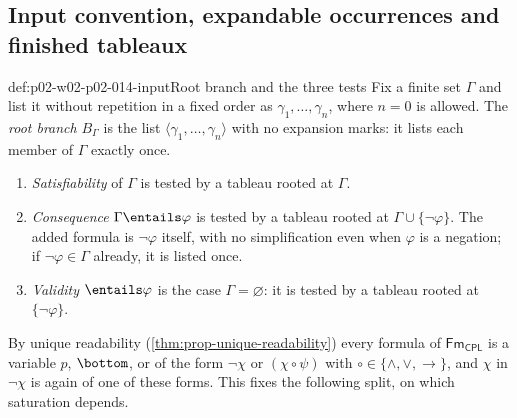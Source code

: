 \subsection{Input convention, expandable occurrences and finished tableaux}
\label{sec:p02-w02-p02-014-input}

\begin{hbconvention}{def:p02-w02-p02-014-input}{Root branch and the three tests}
Fix a finite set \(\Gamma\) and list it without repetition in a fixed
order as \(\gamma_1,\ldots,\gamma_n\), where \(n=0\) is allowed.  The \emph{root branch}
\(B_\Gamma\) is the list \(\langle\gamma_1,\ldots,\gamma_n\rangle\) with no
expansion marks: it lists each member of \(\Gamma\) exactly once.
\begin{enumerate}
  \item \emph{Satisfiability} of \(\Gamma\) is tested by a tableau rooted at
        \(\Gamma\).
  \item \emph{Consequence} \(\Gamma\entails\varphi\) is tested by a tableau
        rooted at \(\Gamma\cup\{\neg\varphi\}\).  The added formula is
        \(\neg\varphi\) itself, with no simplification even when
        \(\varphi\) is a negation; if \(\neg\varphi\in\Gamma\) already, it is
        listed once.
  \item \emph{Validity} \(\entails\varphi\) is the case
        \(\Gamma=\varnothing\): it is tested by a tableau rooted at
        \(\{\neg\varphi\}\).
\end{enumerate}
\end{hbconvention}

By unique readability (\cref{thm:prop-unique-readability}) every formula of
\(\mathsf{Fm}_{\mathsf{CPL}}\) is a variable \(p\), \(\bottom\), or of the
form \(\neg\chi\) or \((\chi\circ\psi)\) with
\(\circ\in\{\land,\lor,\to\}\), and \(\chi\) in \(\neg\chi\) is again of one of
these forms.  This fixes the following split, on which saturation depends.

